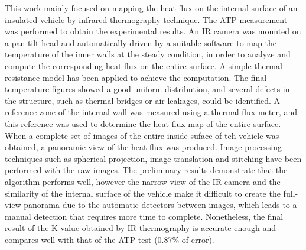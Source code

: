 \documentclass{tQRT2e}
\begin{document}
This work  mainly focused on mapping the heat flux on the internal surface of an insulated vehicle by infrared thermography technique. The ATP measurement was performed to obtain the experimental results. An IR camera was mounted on a pan-tilt head and automatically driven by a suitable software to map the temperature of the inner walls at the steady condition, in order to analyze and compute the corresponding heat flux on the entire surface. A simple thermal resistance model has been applied to achieve the computation. The final temperature figures showed a good uniform distribution, and several defects in the structure, such as thermal bridges or air leakages, could be identified. A reference zone of the internal wall was measured using a thermal flux meter, and this reference was used to determine the heat flux map of the entire surface. When a complete set of images of the entire inside suface of teh vehicle was obtained, a panoramic view of the heat flux was produced. Image processing techniques such as spherical projection, image translation and stitching have been performed with the raw images. The preliminary results demonstrate that the algorithm performs well, however the narrow view of the IR camera and the similarity of the internal surface of the vehicle make it difficult to create the full-view panorama due to the automatic detectors between images, which leads to a manual detection that requires more time to complete. Nonetheless, the final result of the K-value obtained by IR thermography is accurate enough and compares well with that of the ATP test (0.87\% of error).



\end{document}
